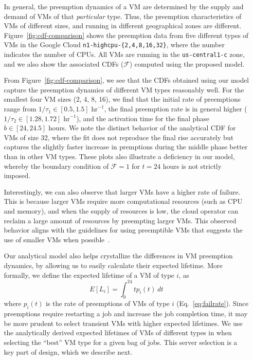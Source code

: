 In general, the preemption dynamics of a VM are determined by the supply and demand of VMs of that \emph{particular} type.
Thus, the preemption characteristics of VMs of different sizes, and running in different geographical zones are different.
Figure~\ref{fig:cdf-comparison} shows the preemption data from five different types of VMs in the Google Cloud \texttt{n1-highcpu-\{2,4,8,16,32\}}, where the number indicates the number of CPUs.
All VMs are running in the \texttt{us-central1-c} zone, and we also show the associated CDFs ($\mathscr{F}$) computed using the proposed model. %

From Figure~\ref{fig:cdf-comparison}, we see that the CDFs obtained using our model capture the preemption dynamics of different VM types reasonably well. For the smallest four VM sizes (2, 4, 8, 16), we find that the initial rate of preemptions range from $1/\tau_1 \in [0.5, 1.5]$ $\text{hr}^{-1}$, the final preemption rate is in general higher ($1/\tau_2 \in [1.28, 1.72]$  $\text{hr}^{-1}$), and the activation time for the final phase $b \in [24, 24.5]$ hours. We note the distinct behavior of the analytical CDF for VMs of size 32, where the fit does not reproduce the final rise accurately but captures the slightly faster increase in premptions during the middle phase better than in other VM types.
These plots also illustrate a deficiency in our model, whereby the boundary condition of $\mathscr{F} = 1$ for $t=24$ hours is not strictly imposed.

Interestingly, we can also observe that larger VMs have a higher rate of failure.
This is because larger VMs require more computational resources (such as CPU and memory), and when the supply of resources is low, the cloud operator can reclaim a large amount of resources by preempting larger VMs.
This observed behavior aligns with the guidelines for using preemptible VMs that suggests the use of smaller VMs when possible~\cite{preemptible-documentation}. 

Our analytical model also helps crystallize the differences in VM preemption dynamics, by allowing us to easily calculate their expected lifetime. 
More formally, we define the expected lifetime of a VM of type $i$, as 
\begin{equation}
  \label{eq:expected-lifetime}
E[L_i] =  \int_{0}^{24} t {p_i}(t)~dt 
\end{equation}
where $p_i(t)$ is the rate of preemptions of VMs of type $i$ (Eq.~\ref{eq:failrate}).
%
Since preemptions require restarting a job and increase the job completion time, it may be more prudent to select transient VMs with higher expected lifetimes. We use the analytically derived expected lifetimes of VMs of different types in \sysname when selecting the ``best'' VM type for a given bag of jobs. This server selection is a key part of \sysname design, which we describe next. 

